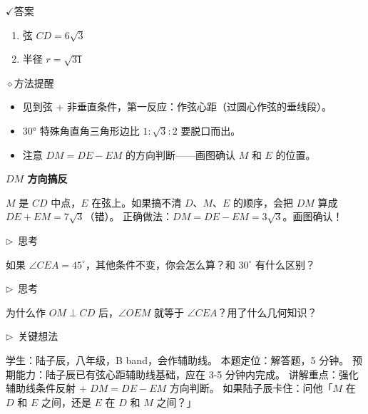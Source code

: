\documentclass{exam-zh}
\newcommand{\edukai}{\kaishu}
\newcommand{\eduSubTitle}[1]{%
  \needspace{4\baselineskip}%
  \vspace{1mm}
  {\color{edu-blue}\bfseries #1}\par
  \vspace{1mm}
}
\newenvironment{eduAuxItem}[1]{%
  \needspace{4\baselineskip}%
  \vspace{2mm}
  \par\noindent
  \hangindent=8mm\hangafter=1
  {\color{edu-blue}\edukai $\triangleright$~#1}\enspace
  \begingroup
  \color{edu-ink}
  \edukai
}{%
  \endgroup
  \par
  \vspace{4mm}
}
\newcommand{\eduIconCheck}{\(\checkmark\)}
\newcommand{\eduIconPin}{\(\diamond\)}
\newenvironment{eduBulletList}{%
  \begin{itemize}[
    label=\textbullet,
    leftmargin=5mm,
    itemsep=1.2mm,
    topsep=0pt,
    parsep=0pt
  ]
}{%
  \end{itemize}
}
\newenvironment{eduBottomGrid}{%
  \vspace{1mm}
  \par\noindent
}{%
  \par\vspace{1mm}
}
\newenvironment{eduSummaryLeft}{%
  \begin{minipage}[t]{0.30\linewidth}
}{%
  \end{minipage}
}
\newcommand{\eduSummaryDivider}{%
  \hspace{4mm}{\color{edu-line}\vrule width 0.35pt}\hspace{7mm}%
}
\newenvironment{eduSummaryRight}{%
  \begin{minipage}[t]{0.58\linewidth}
}{%
  \end{minipage}
}
\newenvironment{eduPlainList}{%
  \begin{enumerate}[
    label=(\arabic*),
    leftmargin=7mm,
    itemsep=1.2mm,
    topsep=0pt,
    parsep=0pt
  ]
}{%
  \end{enumerate}
}
\begin{document}
\begin{eduBottomGrid}
  \begin{eduSummaryLeft}
    \begin{eduSummaryBlock}{\eduIconCheck}{答案}
    \begin{eduPlainList}
      \item 弦 $CD = 6\sqrt{3}$      \item 半径 $r = \sqrt{31}$    \end{eduPlainList}
    \end{eduSummaryBlock}
  \end{eduSummaryLeft}
  \eduSummaryDivider
  \begin{eduSummaryRight}
    \begin{eduSummaryBlock}{\eduIconPin}{方法提醒}
    \begin{eduBulletList}
      \item 见到弦 + 非垂直条件，第一反应：作弦心距（过圆心作弦的垂线段）。      \item 30° 特殊角直角三角形边比 $1:\sqrt{3}:2$ 要脱口而出。      \item 注意 $DM = DE - EM$ 的方向判断——画图确认 $M$ 和 $E$ 的位置。    \end{eduBulletList}
    \end{eduSummaryBlock}
  \end{eduSummaryRight}
\end{eduBottomGrid}




\begin{eduMistakeBox}
\eduSubTitle{$DM$ 方向搞反}$M$ 是 $CD$ 中点，$E$ 在弦上。如果搞不清 $D$、$M$、$E$ 的顺序，会把 $DM$ 算成 $DE + EM = 7\sqrt{3}$（错）。
正确做法：$DM = DE - EM = 3\sqrt{3}$。画图确认！
\end{eduMistakeBox}




\begin{eduAuxItem}{思考}
如果 $\angle CEA = 45^\circ$，其他条件不变，你会怎么算？和 $30^\circ$ 有什么区别？\end{eduAuxItem}




\begin{eduAuxItem}{思考}
为什么作 $OM \perp CD$ 后，$\angle OEM$ 就等于 $\angle CEA$？用了什么几何知识？\end{eduAuxItem}



\clearpage

\begin{eduAuxItem}{关键想法}
学生：陆子辰，八年级，B band，会作辅助线。
本题定位：解答题，5 分钟。
预期能力：陆子辰已有弦心距辅助线基础，应在 3-5 分钟内完成。
讲解重点：强化辅助线条件反射 + $DM = DE - EM$ 方向判断。
如果陆子辰卡住：问他「$M$ 在 $D$ 和 $E$ 之间，还是 $E$ 在 $D$ 和 $M$ 之间？」
\end{eduAuxItem}
\end{document}
